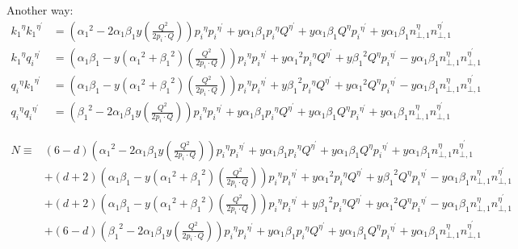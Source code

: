 Another way:
\begin{equation}
\begin{split}
{k_1}^{{\eta}}{k_1}^{{\eta}^{\prime}}&=({\alpha_1}^2 -2\alpha_1 \beta_1 y(\frac{Q^2}{2 p_i \cdot Q})){p_i}^{{\eta}}{p_i}^{{\eta}^{\prime}}+y\alpha_1 \beta_1 {p_i}^{{\eta}}{Q}^{{\eta}^{\prime}}+y\alpha_1 \beta_1 {Q}^{{\eta}}{p_i}^{{\eta}^{\prime}}+y\alpha_1\beta_1 {n}^{{\eta}}_{\bot,1}{n}^{{\eta}^{\prime}}_{\bot,1}\\
{k_1}^{{\eta}}{q_i}^{{\eta}^{\prime}}&=({\alpha_1}\beta_1 -y({\alpha_1}^2 + {\beta_1}^2 )(\frac{Q^2}{2 p_i \cdot Q})){p_i}^{{\eta}}{p_i}^{{\eta}^{\prime}}+y{\alpha_1}^2 {p_i}^{{\eta}}{Q}^{{\eta}^{\prime}}+y{\beta_1}^2 {Q}^{{\eta}}{p_i}^{{\eta}^{\prime}}-y\alpha_1\beta_1 {n}^{{\eta}}_{\bot,1}{n}^{{\eta}^{\prime}}_{\bot,1}\\
{q_i}^{{\eta}}{k_1}^{{\eta}^{\prime}}&=({\alpha_1}\beta_1 -y({\alpha_1}^2 + {\beta_1}^2 )(\frac{Q^2}{2 p_i \cdot Q})){p_i}^{{\eta}}{p_i}^{{\eta}^{\prime}}+y{\beta_1}^2 {p_i}^{{\eta}}{Q}^{{\eta}^{\prime}}+y{\alpha_1}^2 {Q}^{{\eta}}{p_i}^{{\eta}^{\prime}}-y\alpha_1\beta_1 {n}^{{\eta}}_{\bot,1}{n}^{{\eta}^{\prime}}_{\bot,1}\\
{q_i}^{{\eta}}{q_i}^{{\eta}^{\prime}}&=({\beta_1}^2 -2\alpha_1 \beta_1 y(\frac{Q^2}{2 p_i \cdot Q})){p_i}^{{\eta}}{p_i}^{{\eta}^{\prime}}+y\alpha_1 \beta_1 {p_i}^{{\eta}}{Q}^{{\eta}^{\prime}}+y\alpha_1 \beta_1 {Q}^{{\eta}}{p_i}^{{\eta}^{\prime}}+y\alpha_1\beta_1 {n}^{{\eta}}_{\bot,1}{n}^{{\eta}^{\prime}}_{\bot,1}
\end{split}
\end{equation}

\begin{equation}
\begin{split}
N\equiv&(6-d)({\alpha_1}^2 -2\alpha_1 \beta_1 y(\frac{Q^2}{2 p_i \cdot Q})){p_i}^{{\eta}}{p_i}^{{\eta}^{\prime}}+y\alpha_1 \beta_1 {p_i}^{{\eta}}{Q}^{{\eta}^{\prime}}+y\alpha_1 \beta_1 {Q}^{{\eta}}{p_i}^{{\eta}^{\prime}}+y\alpha_1\beta_1 {n}^{{\eta}}_{\bot,1}{n}^{{\eta}^{\prime}}_{\bot,1}\\
&+(d+2)({\alpha_1}\beta_1 -y({\alpha_1}^2 + {\beta_1}^2 )(\frac{Q^2}{2 p_i \cdot Q})){p_i}^{{\eta}}{p_i}^{{\eta}^{\prime}}+y{\alpha_1}^2 {p_i}^{{\eta}}{Q}^{{\eta}^{\prime}}+y{\beta_1}^2 {Q}^{{\eta}}{p_i}^{{\eta}^{\prime}}-y\alpha_1\beta_1 {n}^{{\eta}}_{\bot,1}{n}^{{\eta}^{\prime}}_{\bot,1}\\
&+(d+2)({\alpha_1}\beta_1 -y({\alpha_1}^2 + {\beta_1}^2 )(\frac{Q^2}{2 p_i \cdot Q})){p_i}^{{\eta}}{p_i}^{{\eta}^{\prime}}+y{\beta_1}^2 {p_i}^{{\eta}}{Q}^{{\eta}^{\prime}}+y{\alpha_1}^2 {Q}^{{\eta}}{p_i}^{{\eta}^{\prime}}-y\alpha_1\beta_1 {n}^{{\eta}}_{\bot,1}{n}^{{\eta}^{\prime}}_{\bot,1}\\
&+(6-d)({\beta_1}^2 -2\alpha_1 \beta_1 y(\frac{Q^2}{2 p_i \cdot Q})){p_i}^{{\eta}}{p_i}^{{\eta}^{\prime}}+y\alpha_1 \beta_1 {p_i}^{{\eta}}{Q}^{{\eta}^{\prime}}+y\alpha_1 \beta_1 {Q}^{{\eta}}{p_i}^{{\eta}^{\prime}}+y\alpha_1\beta_1 {n}^{{\eta}}_{\bot,1}{n}^{{\eta}^{\prime}}_{\bot,1}
\end{split}
\end{equation}

